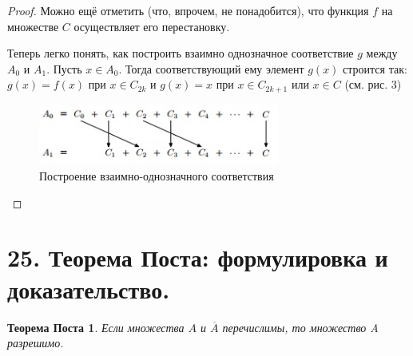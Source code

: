 \documentclass[a4paper, 12pt]{article}
\newtheorem*{poste}{Теорема Поста}
\begin{document}
\begin{proof}
Можно ещё отметить (что, впрочем, не понадобится), что функция $f$ на множестве $C$ осуществляет его перестановку.

Теперь легко понять, как построить взаимно однозначное соответствие $g$ между $A_0$ и $A_1$. Пусть $x \in A_0$. Тогда соответствующий ему элемент $g(x)$ строится так: $g(x) = f(x)$ при $x \in C_{2k}$ и $g(x) = x$ при $x \in C_{2k + 1}$ или $x \in C$ (см. рис. 3)

\begin{figure}[h]
\begin{center}
\begin{minipage}[h]{0.4\linewidth}
 \includegraphics[height=2cm, width=\linewidth]{images/kantorbern3.jpg}
 \caption{Построение взаимно-однозначного соответствия}
 \end{minipage}
 \end{center}
 \end{figure}

\end{proof}

\section*{25. Теорема Поста: формулировка и доказательство.}

\begin{poste}

Если множества $A$ и $\overline{A}$ перечислимы, то множество A разрешимо.

\end{poste}
\end{document}
